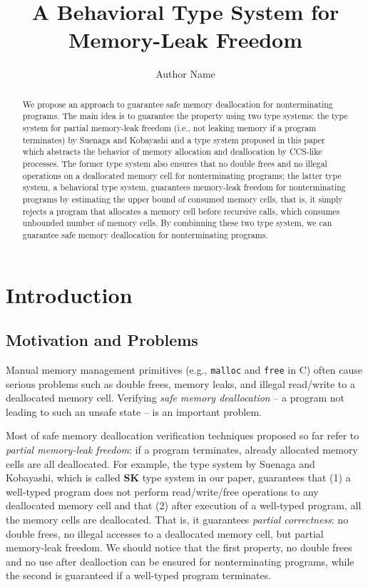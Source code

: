 \documentclass[english]{jssst_ppl} %
\title{A Behavioral Type System for Memory-Leak Freedom}
\author{Author Name}
\begin{document}
\maketitle
\begin{abstract}
We propose an approach to guarantee safe memory deallocation for nonterminating programs. The main idea is to guarantee the property using two type systems: the type system for partial memory-leak freedom (i.e., not leaking memory if a program terminates) by Suenaga and Kobayashi and a type system proposed in this paper which abstracts the behavior of memory allocation and deallocation by CCS-like processes. The former type system also ensures that no double frees and no illegal operations on a deallocated memory cell for nonterminating programs; the latter type system, a behavioral type system, guarantees memory-leak freedom for nonterminating programs by estimating the upper bound of consumed memory cells, that is, it simply rejects a program that allocates a memory cell before recursive calls, which consumes unbounded number of memory cells. By combinning these two type system, we can guarantee safe memory deallocation for nonterminating programs.
\end{abstract}

\section{Introduction}
\subsection{Motivation and Problems}
Manual memory management primitives (e.g., \texttt{malloc} and \texttt{free} in C) often cause serious problems such as double frees, memory leaks, and illegal read/write to a deallocated memory cell. Verifying \emph{safe memory deallocation} -- a program not leading to such an unsafe state -- is an important problem.

Most of safe memory deallocation verification techniques proposed so far\cite{DBLP:conf/aplas/SuenagaK09,DBLP:conf/pldi/HeineL03,DBLP:conf/sigsoft/XieA05,DBLP:journals/scp/SwamyHMGJ06} refer to \emph{partial memory-leak freedom}: if a program terminates, already allocated memory cells are all deallocated. For example, the type system by Suenaga and Kobayashi\cite{DBLP:conf/aplas/SuenagaK09}, which is called \textbf{SK} type system in our paper, guarantees that (1) a well-typed program does not perform read/write/free operations to any deallocated memory cell and that (2) after execution of a well-typed program, all the memory cells are deallocated. That is, it guarantees \emph{partial correctness}: no double frees, no illegal accesses to a deallocated memory cell, but partial memory-leak freedom. We should notice that the first property, no double frees and no use after dealloction can be ensured for nonterminating programs, while the second is guaranteed if a well-typed program terminates.
\end{document}
